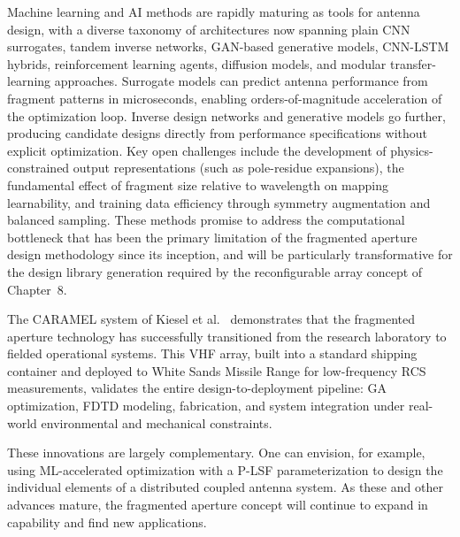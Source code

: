 Machine learning and AI methods are rapidly maturing as tools for antenna design, with a diverse taxonomy of architectures now spanning plain CNN surrogates, tandem inverse networks, GAN-based generative models, CNN-LSTM hybrids, reinforcement learning agents, diffusion models, and modular transfer-learning approaches.  Surrogate models can predict antenna performance from fragment patterns in microseconds, enabling orders-of-magnitude acceleration of the optimization loop.  Inverse design networks and generative models go further, producing candidate designs directly from performance specifications without explicit optimization.  Key open challenges include the development of physics-constrained output representations (such as pole-residue expansions), the fundamental effect of fragment size relative to wavelength on mapping learnability, and training data efficiency through symmetry augmentation and balanced sampling.  These methods promise to address the computational bottleneck that has been the primary limitation of the fragmented aperture design methodology since its inception, and will be particularly transformative for the design library generation required by the reconfigurable array concept of Chapter~8.

The CARAMEL system of Kiesel et al.\ \cite{Kiesel2018Conex} demonstrates that the fragmented aperture technology has successfully transitioned from the research laboratory to fielded operational systems.  This VHF array, built into a standard shipping container and deployed to White Sands Missile Range for low-frequency RCS measurements, validates the entire design-to-deployment pipeline: GA optimization, FDTD modeling, fabrication, and system integration under real-world environmental and mechanical constraints.

These innovations are largely complementary.  One can envision, for example, using ML-accelerated optimization with a P-LSF parameterization to design the individual elements of a distributed coupled antenna system.  As these and other advances mature, the fragmented aperture concept will continue to expand in capability and find new applications.


\FloatBarrier



